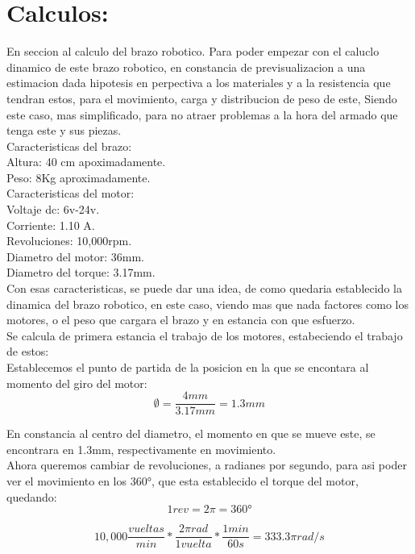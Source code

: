 \documentclass[14pt,a4paper]{article}
\begin{document}
\section{Calculos:}
En seccion al calculo del brazo robotico. Para poder empezar con el caluclo dinamico de este brazo robotico, en constancia de previsualizacion a una estimacion dada hipotesis en perpectiva a los materiales y a la resistencia que tendran estos, para el movimiento, carga y distribucion de peso de este, Siendo este caso, mas simplificado, para no atraer problemas a la hora del armado que tenga este y sus piezas.\\

Caracteristicas del brazo:\\
Altura: 40 cm apoximadamente.\\
Peso: 8Kg aproximadamente.\\
Caracteristicas del motor:\\
Voltaje dc: 6v-24v.\\
Corriente: 1.10 A.\\
Revoluciones: 10,000rpm.\\
Diametro del motor: 36mm.\\
Diametro del torque: 3.17mm.\\
Con esas caracteristicas, se puede dar una idea, de como quedaria establecido la dinamica del brazo robotico, en este caso, viendo mas que nada factores como los motores, o el peso que cargara el brazo y en estancia con que esfuerzo.\\
Se calcula de primera estancia el trabajo de los motores, estabeciendo el trabajo de estos:\\

Establecemos el punto de partida de la posicion en la que se encontara al momento del giro del motor:\\

$$ \emptyset=\frac{4mm}{3.17mm}= 1.3mm $$

En constancia al centro del diametro, el momento en que se mueve este, se encontrara en 1.3mm, respectivamente en movimiento.\\
Ahora queremos cambiar de revoluciones, a radianes por segundo, para asi poder ver el movimiento en los 360°, que esta establecido el torque del motor, quedando:\\

$$ 1rev=2\pi=360°$$

$$ 10,000 \frac{vueltas}{min}*\dfrac{2\pi rad}{1 vuelta}*\frac{1 min}{60s}= 333.3 \pi rad/s $$
\end{document}
